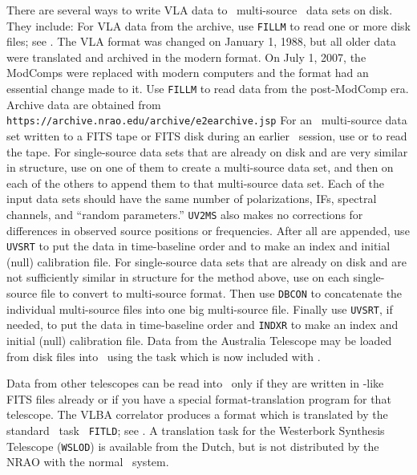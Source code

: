      There are several ways to write VLA data to \AIPS\ multi-source
\uv\ data sets on disk. They include:
\xben
\Item For VLA data from the archive, use {\tt FILLM} to read one or
    more disk files; see .   The VLA format was changed
    on January 1, 1988, but all older data were translated and
    archived in the modern format.  On July 1, 2007, the ModComps were
    replaced with modern computers and the format had an essential
    change made to it.  Use {\tt FILLM} to read data from the
    post-ModComp era.  Archive data are obtained from
    {\tt https://archive.nrao.edu/archive/e2earchive.jsp}
\Item For an \AIPS\ multi-source data set written to a FITS tape or
    FITS disk during an earlier \AIPS\ session, use {\tt {}}
    or {\tt {}} to read the tape.
\Item For single-source data sets that are already on disk and
    are very similar in structure, use {\tt {}} on one of
    them to create a multi-source data set, and then on each of the
    others to append them to that multi-source data set.  Each of the
    input data sets should have the same number of polarizations, IFs,
    spectral channels, and ``random parameters.''  {\tt UV2MS} also
    makes no corrections for differences in observed source positions
    or frequencies.  After all are appended, use {\tt UVSRT} to put
    the data in time-baseline order and {\tt {}} to make an
    index and initial (null) calibration file.
\Item For single-source data sets that are already on disk and
    are not sufficiently similar in structure for the method above,
    use {\tt {}} on each single-source file to convert to
    multi-source format.  Then use {\tt DBCON} to concatenate the
    individual multi-source files into one big multi-source file.
    Finally use {\tt UVSRT}, if needed, to put the data in
    time-baseline order and {\tt INDXR} to make an index and initial
    (null) calibration file.
\Item Data from the Australia Telescope may be loaded from disk files
    into \AIPS\ using the task {\tt {}} which is now
    included with \AIPS\@.
\xeen

     Data from other telescopes can be read into \AIPS\ only if they
are written in \AIPS-like FITS files already or if you have a special
format-translation program for that telescope.  The VLBA correlator
produces a format which is translated by the standard \AIPS\ task {\tt
FITLD}; see .  A translation task for the Westerbork
Synthesis Telescope ({\tt WSLOD}) is available from the Dutch,
but is not distributed by the NRAO with the normal \AIPS\ system.

